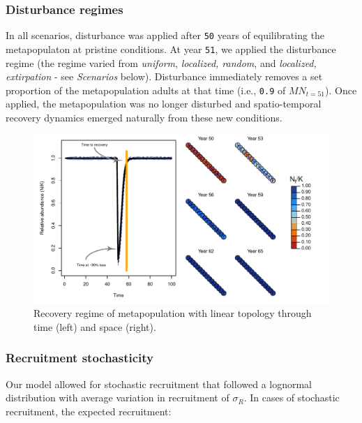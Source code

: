 \documentclass[]{article}
\begin{document}
\hypertarget{disturbance-regimes}{%
\subsubsection{Disturbance regimes}\label{disturbance-regimes}}

In all scenarios, disturbance was applied after \texttt{50} years of
equilibrating the metapopulaton at pristine conditions. At year
\texttt{51}, we applied the disturbance regime (the regime varied from
\emph{uniform}, \emph{localized, random}, and \emph{localized,
extirpation} - see \emph{Scenarios} below). Disturbance immediately
removes a set proportion of the metapopulation adults at that time
(i.e., \texttt{0.9} of \(MN_{t=51}\)). Once applied, the metapopulation
was no longer disturbed and spatio-temporal recovery dynamics emerged
naturally from these new conditions.

\begin{figure}[H]

{\centering \includegraphics{Managing_for_ecological_surprises_in_metapopulations_makeHTML_files/figure-latex/example disturbance regime-1} 

}

\caption{Recovery regime of metapopulation with linear topology through time (left) and space (right).}\label{fig:example disturbance regime}
\end{figure}

\hypertarget{recruitment-stochasticity}{%
\subsubsection{Recruitment
stochasticity}\label{recruitment-stochasticity}}

Our model allowed for stochastic recruitment that followed a lognormal
distribution with average variation in recruitment of \(\sigma_R\). In
cases of stochastic recruitment, the expected recruitment:
\end{document}
